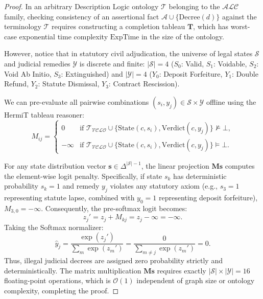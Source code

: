 \documentclass[11pt,a4paper]{article}
\begin{document}
\begin{proof}
In an arbitrary Description Logic ontology $\mathcal{T}$ belonging to the $\mathcal{ALC}$ family, checking consistency of an assertional fact $\mathcal{A} \cup \{\mathrm{Decree}(d)\}$ against the terminology $\mathcal{T}$ requires constructing a completion tableau $\mathbf{T}$, which has worst-case exponential time complexity $\text{ExpTime}$ in the size of the ontology.

However, notice that in statutory civil adjudication, the universe of legal states $\mathcal{S}$ and judicial remedies $\mathcal{Y}$ is discrete and finite: $|\mathcal{S}| = 4$ ($S_0$: Valid, $S_1$: Voidable, $S_2$: Void Ab Initio, $S_3$: Extinguished) and $|\mathcal{Y}| = 4$ ($Y_0$: Deposit Forfeiture, $Y_1$: Double Refund, $Y_2$: Statute Dismissal, $Y_3$: Contract Rescission).

We can pre-evaluate all pairwise combinations $(s_i, y_j) \in \mathcal{S} \times \mathcal{Y}$ offline using the HermiT tableau reasoner:
\begin{equation}
M_{ij} = \begin{cases}
0 & \text{if } \mathcal{T}_{\mathcal{VCLO}} \cup \{ \mathrm{State}(c, s_i), \mathrm{Verdict}(c, y_j) \} \not\models \bot, \\
-\infty & \text{if } \mathcal{T}_{\mathcal{VCLO}} \cup \{ \mathrm{State}(c, s_i), \mathrm{Verdict}(c, y_j) \} \models \bot.
\end{cases}
\end{equation}

For any state distribution vector $\mathbf{s} \in \Delta^{|\mathcal{S}|-1}$, the linear projection $\mathbf{M} \mathbf{s}$ computes the element-wise logit penalty. Specifically, if state $s_k$ has deterministic probability $s_k = 1$ and remedy $y_j$ violates any statutory axiom (e.g., $s_3 = 1$ representing statute lapse, combined with $y_0 = 1$ representing deposit forfeiture), $M_{3,0} = -\infty$. Consequently, the pre-softmax logit becomes:
\begin{equation}
z_j' = z_j + M_{kj} = z_j - \infty = -\infty.
\end{equation}
Taking the Softmax normalizer:
\begin{equation}
\hat{y}_j = \frac{\exp(z_j')}{\sum_{m} \exp(z_m')} = \frac{0}{\sum_{m \neq j} \exp(z_m')} = 0.
\end{equation}
Thus, illegal judicial decrees are assigned zero probability strictly and deterministically. The matrix multiplication $\mathbf{M}\mathbf{s}$ requires exactly $|\mathcal{S}| \times |\mathcal{Y}| = 16$ floating-point operations, which is $\mathcal{O}(1)$ independent of graph size or ontology complexity, completing the proof.
\end{proof}
\end{document}
